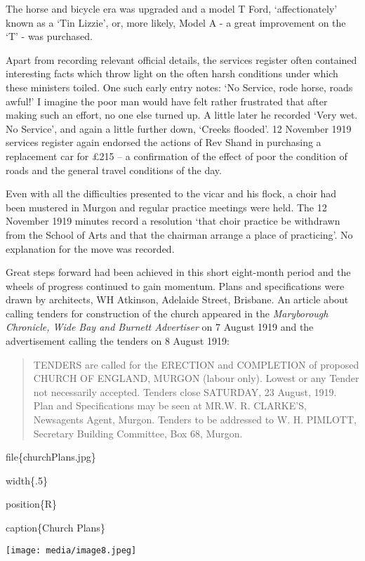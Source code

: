 The horse and bicycle era was upgraded and a model T Ford,
`affectionately' known as a `Tin Lizzie', or, more likely, Model A - a
great improvement on the `T' - was purchased.

Apart from recording relevant official details, the services register
often contained interesting facts which throw light on the often harsh
conditions under which these ministers toiled. One such early entry
notes: `No Service, rode horse, roads awful!' I imagine the poor man
would have felt rather frustrated that after making such an effort, no
one else turned up. A little later he recorded `Very wet. No Service',
and again a little further down, `Creeks flooded'. 12 November 1919
services register again endorsed the actions of Rev Shand in purchasing
a replacement car for £215 -- a confirmation of the effect of poor the
condition of roads and the general travel conditions of the day.

Even with all the difficulties presented to the vicar and his flock, a
choir had been mustered in Murgon and regular practice meetings were
held. The 12 November 1919 minutes record a resolution `that choir
practice be withdrawn from the School of Arts and that the chairman
arrange a place of practicing'. No explanation for the move was
recorded.

Great steps forward had been achieved in this short eight-month period
and the wheels of progress continued to gain momentum. Plans and
specifications were drawn by architects, WH Atkinson, Adelaide Street,
Brisbane. An article about calling tenders for construction of the
church appeared in the \emph{Maryborough Chronicle, Wide Bay and Burnett
Advertiser} on 7 August 1919 and the advertisement calling the tenders
on 8 August 1919:

\begin{quote}
TENDERS are called for the ERECTION and COMPLETION of proposed CHURCH OF
ENGLAND, MURGON (labour only). Lowest or any Tender not necessarily
accepted. Tenders close SATURDAY, 23 August, 1919. Plan and
Specifications may be seen at MR.W. R. CLARKE'S, Newsagents Agent,
Murgon. Tenders to be addressed to W. H. PIMLOTT, Secretary Building
Committee, Box 68, Murgon.
\end{quote}

file\{churchPlans.jpg\}

width\{.5\}

position\{R\}

caption\{Church Plans\}

\texttt{[image: media/image8.jpeg]}

